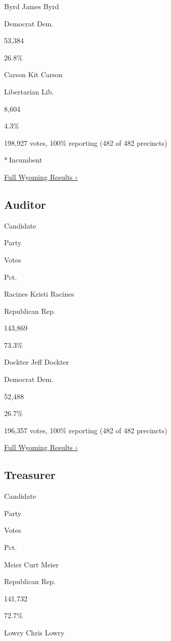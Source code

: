  Byrd James Byrd

Democrat Dem.

53,384

26.8\%

 Carson Kit Carson

Libertarian Lib.

8,604

4.3\%

198,927 votes, 100\% reporting (482 of 482 precincts)

* Incumbent

\href{https://www.nytimes3xbfgragh.onion/interactive/2018/11/06/us/elections/results-wyoming-elections.html}{Full
Wyoming Results ›}

\hypertarget{auditor}{%
\subsection{Auditor}\label{auditor}}

Candidate

Party

Votes

Pct.

 Racines Kristi Racines

Republican Rep.

143,869

73.3\%

 Dockter Jeff Dockter

Democrat Dem.

52,488

26.7\%

196,357 votes, 100\% reporting (482 of 482 precincts)

\href{https://www.nytimes3xbfgragh.onion/interactive/2018/11/06/us/elections/results-wyoming-elections.html}{Full
Wyoming Results ›}

\hypertarget{treasurer}{%
\subsection{Treasurer}\label{treasurer}}

Candidate

Party

Votes

Pct.

 Meier Curt Meier

Republican Rep.

141,732

72.7\%

 Lowry Chris Lowry

